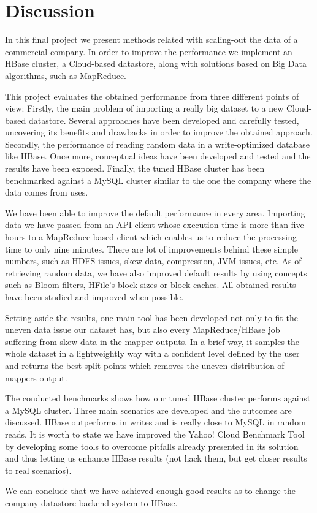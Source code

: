 \section{Discussion}

In this final project we present methods related with scaling-out the data of a commercial company. In order to improve the performance we implement an HBase cluster, a Cloud-based datastore, along with solutions based on Big Data algorithms, such as MapReduce.
\par
This project evaluates the obtained performance from three different points of view: Firstly, the main problem of importing a really big dataset to a new Cloud-based datastore. Several approaches have been developed and carefully tested, uncovering its benefits and drawbacks in order to improve the obtained approach. Secondly,  the performance of reading random data in a write-optimized database like HBase. Once more, conceptual ideas have been developed and tested and the results have been exposed. Finally, the tuned HBase cluster has been benchmarked against a MySQL cluster similar to the one the company where the data comes from uses.
\par
We have been able to improve the default performance in every area. Importing data we have passed from an API client whose execution time is more than five hours to a MapReduce-based client which enables us to reduce the processing time to only nine minutes. There are lot of improvements behind these simple numbers, such as HDFS issues, skew data, compression, JVM issues, etc. As of retrieving random data, we have also improved default results by using concepts such as Bloom filters, HFile's block sizes or block caches. All obtained results have been studied and improved when possible.
\par
Setting aside the results, one main tool has been developed not only to fit the uneven data issue our dataset has, but also every MapReduce/HBase job suffering from skew data in the mapper outputs. In a brief way, it samples the whole dataset in a lightweightly way with a confident level defined by the user and returns the best split points which removes the uneven distribution of mappers output.  
\par
The conducted benchmarks shows how our tuned HBase cluster performs against a MySQL cluster. Three main scenarios are developed and the outcomes are discussed. HBase outperforms in writes and is really close to MySQL in random reads. It is worth to state we have improved the Yahoo! Cloud Benchmark Tool by developing some tools to overcome pitfalls already presented in its solution and thus letting us enhance HBase results (not hack them, but get closer results to real scenarios).
\par
We can conclude that we have achieved enough good results as to change the company datastore backend system to HBase.

